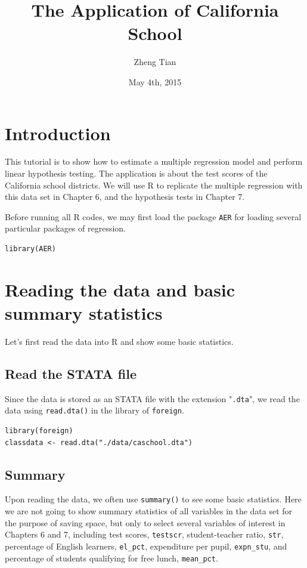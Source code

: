 \documentclass[a4paper,11pt]{article}
\author{Zheng Tian}
\date{May 4th, 2015}
\title{The Application of California School}
\begin{document}
\maketitle

\section{Introduction}
\label{sec:org1467496}
This tutorial is to show how to estimate a multiple regression model
and perform linear hypothesis testing. The application is about the
test scores of the California school districts. We will use R to
replicate the multiple regression with this data set in Chapter 6, and
the hypothesis tests in Chapter 7.

Before running all R codes, we may first load the package \texttt{AER} for loading several
particular packages of regression.
\begin{verbatim}
library(AER)
\end{verbatim}

\section{Reading the data and basic summary statistics}
\label{sec:org33e25ef}
Let's first read the data into R and show some basic statistics.
\subsection*{Read the STATA file}
\label{sec:orgcb9adba}
Since the data is stored as an STATA file with the extension
  "\texttt{.dta}", we read the data using \texttt{read.dta()} in the library of
  \texttt{foreign}.

\begin{verbatim}
library(foreign)
classdata <- read.dta("./data/caschool.dta")
\end{verbatim}

\subsection*{Summary}
\label{sec:org0128645}
Upon reading the data, we often use \texttt{summary()} to see some basic
statistics. Here we are not going to show summary statistics of all
variables in the data set for the purpose of saving space, but only to
select several variables of interest in Chapters 6 and 7, including
test scores, \texttt{testscr}, student-teacher ratio, \texttt{str}, percentage of
English learners, \texttt{el\_pct}, expenditure per pupil, \texttt{expn\_stu}, and
percentage of students qualifying for free lunch, \texttt{mean\_pct}.
\end{document}
